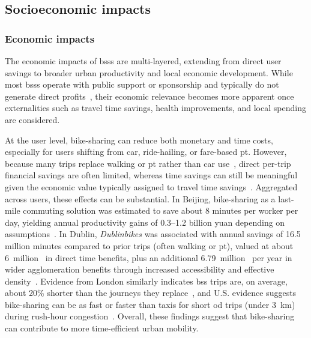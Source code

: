 \subsection{Socioeconomic impacts}

\subsubsection{Economic impacts}

The economic impacts of \acp{bss} are multi-layered, extending from direct user savings to broader urban productivity and local economic development. While most \acp{bss} operate with public support or sponsorship and typically do not generate direct profits~\cite{Luo2019}, their economic relevance becomes more apparent once externalities such as travel time savings, health improvements, and local spending are considered.

At the user level, bike-sharing can reduce both monetary and time costs, especially for users shifting from car, ride-hailing, or fare-based \ac{pt}. However, because many trips replace walking or \ac{pt} rather than car use~\cite{Murphy2015, Fishman2013, Fishman2014, BachandMarleau2012}, direct per-trip financial savings are often limited, whereas time savings can still be meaningful given the economic value typically assigned to travel time savings~\cite{Qiu2018}. Aggregated across users, these effects can be substantial. In Beijing, bike-sharing as a last-mile commuting solution was estimated to save about 8 minutes per worker per day, yielding annual productivity gains of 0.3--1.2 billion yuan depending on assumptions~\cite{Qiu2018}. In Dublin, \textit{Dublinbikes} was associated with annual savings of 16.5 million minutes compared to prior trips (often walking or \ac{pt}), valued at about 6~million~\texteuro{} in direct time benefits, plus an additional 6.79~million~\texteuro{} per year in wider agglomeration benefits through increased accessibility and effective density~\cite{Bullock2017}. Evidence from London similarly indicates \ac{bss} trips are, on average, about 20\% shorter than the journeys they replace~\cite{Woodcock2014}, and U.S. evidence suggests bike-sharing can be as fast or faster than taxis for short \ac{od} trips (under 3~km) during rush-hour congestion~\cite{FaghihImani2017_Hail}. Overall, these findings suggest that bike-sharing can contribute to more time-efficient urban mobility.

